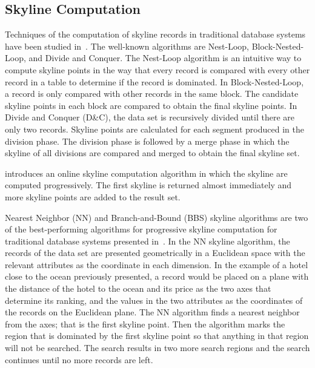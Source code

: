 
\subsection{Skyline Computation}

Techniques of the computation of skyline records in traditional
database systems have been studied
in~\cite{conf/icde/BorzsonyiKS01,shooting_stars,progressive_skyline}.
The well-known algorithms are Nest-Loop, Block-Nested-Loop, and
Divide and Conquer. The Nest-Loop algorithm is an intuitive way to
compute skyline points in the way that every record is compared
with every other record in a table to determine if the record is
dominated. In Block-Nested-Loop, a record is only compared with
other records in the same block. The candidate skyline points in
each block are compared to obtain the final skyline points. In
Divide and Conquer (D\&C), the data set is recursively divided
until there are only two records. Skyline points are calculated
for each segment produced in the division phase. The division
phase is followed by a merge phase in which the skyline of all
divisions are compared and merged to obtain the final skyline set.

\cite{shooting_stars} introduces an online skyline computation
algorithm in which the skyline are computed progressively. The
first skyline is returned almost immediately and more skyline
points are added to the result set.

Nearest Neighbor (NN) and Branch-and-Bound (BBS) skyline
algorithms are two of the best-performing algorithms for
progressive skyline computation for traditional database systems
presented in~\cite{progressive_skyline}. In the NN skyline
algorithm, the records of the data set are presented geometrically
in a Euclidean space with the relevant attributes as the
coordinate in each dimension. In the example of a hotel close to
the ocean previously presented, a record would be placed on a
plane with the distance of the hotel to the ocean and its price as
the two axes that determine its ranking, and the values in the two
attributes as the coordinates of the records on the Euclidean
plane. The NN algorithm finds a nearest neighbor from the axes;
that is the first skyline point. Then the algorithm marks the
region that is dominated by the first skyline point so that
anything in that region will not be searched. The search results
in two more search regions and the search continues until no more
records are left.


